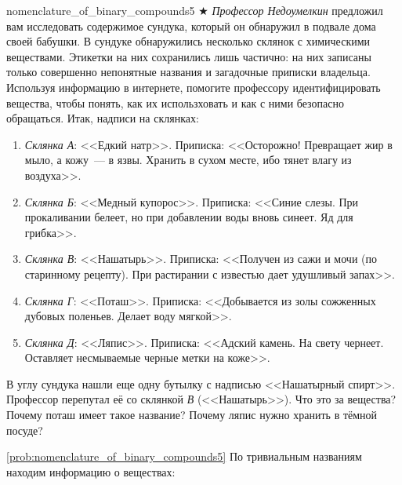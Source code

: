 \begin{problem}{}{nomenclature_of_binary_compounds5}
    $\bigstar$ \emph{Профессор Недоумелкин} предложил вам исследовать содержимое сундука, который он обнаружил в подвале дома своей бабушки. В сундуке обнаружились несколько склянок с химическими веществами. Этикетки на них сохранились лишь частично: на них записаны только совершенно непонятные названия и загадочные приписки владельца. Используя информацию в интернете, помогите профессору идентифицировать вещества, чтобы понять, как их использховать и как с ними безопасно обращаться. Итак, надписи на склянках:
    \begin{enumerate}[label=\arabic*)]
        \item \textit{Склянка А}: <<Едкий натр>>. Приписка: <<Осторожно! Превращает жир в мыло, а кожу~--- в язвы. Хранить в сухом месте, ибо тянет влагу из воздуха>>.
        \item \textit{Склянка Б}: <<Медный купорос>>. Приписка: <<Синие слезы. При прокаливании белеет, но при добавлении воды вновь синеет. Яд для грибка>>.
        \item \textit{Склянка В}: <<Нашатырь>>. Приписка: <<Получен из сажи и мочи (по старинному рецепту). При растирании с известью дает удушливый запах>>.
        \item \textit{Склянка Г}: <<Поташ>>. Приписка: <<Добывается из золы сожженных дубовых поленьев. Делает воду мягкой>>.
        \item \textit{Склянка Д}: <<Ляпис>>. Приписка: <<Адский камень. На свету чернеет. Оставляет несмываемые черные метки на коже>>.
    \end{enumerate}
    В углу сундука нашли еще одну бутылку с надписью <<Нашатырный спирт>>. Профессор перепутал её со склянкой \textit{В} (<<Нашатырь>>). Что это за вещества? Почему поташ имеет такое название? Почему ляпис нужно хранить в тёмной посуде?
    \begin{sol}{\ref{prob:nomenclature_of_binary_compounds5}}
        По тривиальным названиям находим информацию о веществах:


\end{sol}
\end{problem}
